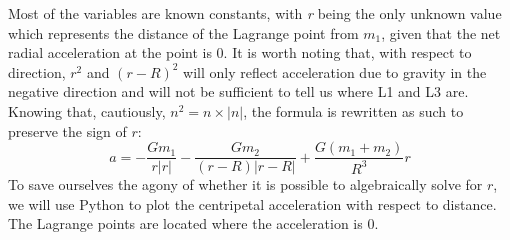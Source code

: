 Most of the variables are known constants, with \textit{r} being the only unknown value which represents the distance of the Lagrange point from $m_1$, given that the net radial acceleration at the point is 0.
It is worth noting that, with respect to direction, $r^2$ and $(r-R)^2$ will only reflect acceleration due to gravity in the negative direction and will not be sufficient to tell us where L1 and L3 are.
Knowing that, cautiously, $n^2 = n \times |n|$, the formula is rewritten as such to preserve the sign of $r$:
\begin{equation}
	a = -\frac{Gm_1}{r|r|} - \frac{Gm_2}{(r - R)|r - R|} + \frac{G(m_1+m_2)}{R^3}r \label{eqn:x-accel1}
\end{equation}
To save ourselves the agony of whether it is possible to algebraically solve for $r$, we will use Python to plot the centripetal acceleration with respect to distance. The Lagrange points are located where the acceleration is 0.

